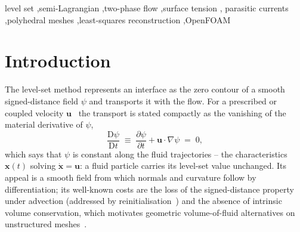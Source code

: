 \documentclass[preprint,3p,11pt]{elsarticle}
\newcommand{\psilev}{\psi}                       %
\newcommand{\uvec}{\mathbf{u}}
\begin{document}
\begin{frontmatter}
\begin{abstract}
level set to a one-field incompressible Navier--Stokes solver -- with the interface
curvature evaluated \emph{symbolically} from the gradient and Hessian of the same
quadratic reconstruction and extended constant along the interface normal -- yields a
continuum-surface-force model that needs no auxiliary curvature field. On the stationary
water/air droplet benchmark the Young--Laplace pressure jump is recovered to within a few
percent and converges with resolution, and, with the balanced-force pressure/surface-tension
coupling, the parasitic currents decay to a small settled level on the resolved-interface
range; on finer meshes a transport-coupled feedback -- the reinitialisation-free level set
drifting off the signed distance and amplifying the curvature error, confirmed by a
frozen-interface control -- destabilises them, identifying signed-distance consistency and
curvature-error reduction, not the (balanced) force discretisation, as the levers for future
work. The method and its runtime-selectable implementation
in OpenFOAM are described, and all results are reproducible from the accompanying
open-source repository with a single command.
\end{abstract}

\begin{keyword}
level set \sep semi-Lagrangian \sep two-phase flow \sep surface tension \sep
parasitic currents \sep polyhedral meshes \sep least-squares reconstruction \sep OpenFOAM
\end{keyword}

\end{frontmatter}

\section{Introduction}
\label{sec:intro}
The level-set method represents an interface as the zero contour of a smooth
signed-distance field $\psilev$ and transports it with the flow. For a prescribed or
coupled velocity $\uvec$~\cite{osher1988,sethian1999} the transport is stated compactly
as the vanishing of the material derivative of $\psilev$,
\begin{equation}
  \frac{\mathrm{D}\psilev}{\mathrm{D}t}
  \;\equiv\; \frac{\partial \psilev}{\partial t} + \uvec\cdot\nabla\psilev \;=\; 0 ,
  \label{eq:levelset}
\end{equation}
which says that $\psilev$ is constant along the fluid trajectories -- the
characteristics $\mathbf{x}(t)$ solving $\dot{\mathbf{x}}=\uvec$: a fluid particle
carries its level-set value unchanged. Its
appeal is a smooth field from which normals and curvature follow by
differentiation; its well-known costs are the loss of the signed-distance property
under advection (addressed by reinitialisation~\cite{sussman1994}) and the absence
of intrinsic volume conservation, which motivates geometric
volume-of-fluid alternatives on unstructured meshes~\cite{roenby2016,maric2020}.
\end{document}
